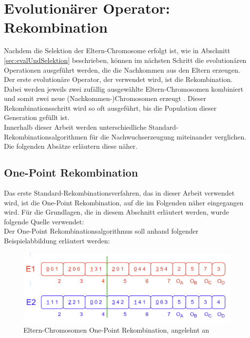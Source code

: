 \section{Evolutionärer Operator: Rekombination}
\label{sec:evolutionäreOperatoren}
Nachdem die Selektion der Eltern-Chromosome erfolgt ist, wie in Abschnitt \ref{sec:evalUndSelektion} beschrieben, können im nächsten Schritt die evolutionären Operationen ausgeführt werden, die die Nachkommen aus den Eltern erzeugen. \\
Der erste evolutionäre Operator, der verwendet wird, ist die Rekombination.
Dabei werden jeweils zwei zufällig ausgewählte Eltern-Chromosomen kombiniert und somit zwei neue (Nachkommen-)Chromosomen erzeugt \cite{kalkreuth_comprehensive_2020}. Dieser Rekombinationsschritt wird so oft ausgeführt, bis die Population dieser Generation gefüllt ist.\\
Innerhalb dieser Arbeit werden unterschiedliche Standard-Rekombinationsalgorithmen für die Nachwuchserzeugung miteinander verglichen.
Die folgenden Absätze erläutern diese näher.

\subsection{One-Point Rekombination}
\label{subsubsec:onePointCrossover}
Das erste Standard-Rekombinationsverfahren, das in dieser Arbeit verwendet wird, ist die One-Point Rekombination, auf die im Folgenden näher eingegangen wird.
Für die Grundlagen, die in diesem Abschnitt erläutert werden, wurde folgende Quelle verwendet: \cite{pavai_survey_2017}\\
Der One-Point Rekombinationsalgorithmus soll anhand folgender Beispielabbildung erläutert werden:

\begin{figure}[H]
    \centering
    \includegraphics[scale = 0.45]{Bilder/BeispielOnePointCrossover.png}
    \caption{Eltern-Chromosomen One-Point Rekombination, angelehnt an \cite{torabi_using_2022}}
    \label{fig:onePointCrossoverEltern}
\end{figure}

